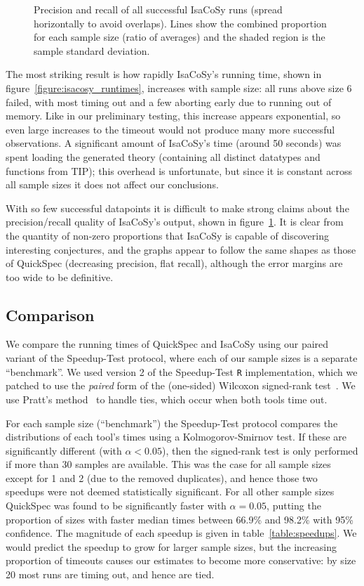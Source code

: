\begin{figure}
  \centering
  
  \caption{Precision and recall of all successful IsaCoSy runs (spread
    horizontally to avoid overlaps). Lines show the combined proportion for each
    sample size (ratio of averages) and the shaded region is the sample standard
    deviation.}
  \label{figure:isacosy_precRec}
\end{figure}

The most striking result is how rapidly IsaCoSy's running time, shown in
figure~\ref{figure:isacosy_runtimes}, increases with sample size: all runs above
size 6 failed, with most timing out and a few aborting early due to running out
of memory. Like in our preliminary testing, this increase appears exponential,
so even large increases to the timeout would not produce many more successful
observations. A significant amount of IsaCoSy's time (around 50 seconds) was
spent loading the generated theory (containing all distinct datatypes and
functions from TIP); this overhead is unfortunate, but since it is constant
across all sample sizes it does not affect our conclusions.

With so few successful datapoints it is difficult to make strong claims about
the precision/recall quality of IsaCoSy's output, shown in
figure~\ref{figure:isacosy_precRec}. It is clear from the quantity of non-zero
proportions that IsaCoSy is capable of discovering interesting conjectures, and
the graphs appear to follow the same shapes as those of QuickSpec (decreasing
precision, flat recall), although the error margins are too wide to be
definitive.

\subsection{Comparison}

We compare the running times of QuickSpec and IsaCoSy using our paired variant
of the Speedup-Test protocol, where each of our sample sizes is a separate
``benchmark''. We used version 2 of the Speedup-Test \texttt{R} implementation,
which we patched to use the \emph{paired} form of the (one-sided) Wilcoxon
signed-rank test~\cite{wilcoxon1945individual}. We use Pratt's
method~\cite{pratt1959remarks} to handle ties, which occur when both tools time
out.

For each sample size (``benchmark'') the Speedup-Test protocol compares the
distributions of each tool's times using a Kolmogorov-Smirnov test. If these are
significantly different (with $\alpha < 0.05$), then the signed-rank test is
only performed if more than 30 samples are available. This was the case for all
sample sizes except for 1 and 2 (due to the removed duplicates), and hence those
two speedups were not deemed statistically significant. For all other sample
sizes QuickSpec was found to be significantly faster with $\alpha = 0.05$,
putting the proportion of sizes with faster median times between 66.9\% and
98.2\% with 95\% confidence. The magnitude of each speedup is given in
table~\ref{table:speedups}. We would predict the speedup to grow for larger
sample sizes, but the increasing proportion of timeouts causes our estimates to
become more conservative: by size 20 most runs are timing out, and hence are
tied.

